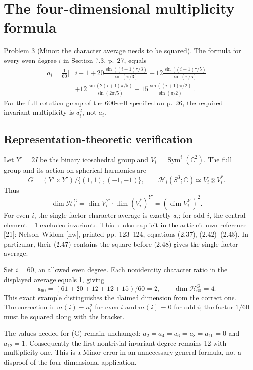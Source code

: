 \documentclass[10pt]{article}
\begin{document}
\section*{The four-dimensional multiplicity formula}
Problem 3 (Minor: the character average needs to be squared).  The formula for every even degree \(i\) in Section 7.3, p. 27, equals \[\begin{aligned}
 a_i=\frac1{60}\bigg[&
 i+1+20\frac{\sin((i+1)\pi/3)}{\sin(\pi/3)}
 +12\frac{\sin((i+1)\pi/5)}{\sin(\pi/5)}\\
 &+12\frac{\sin(2(i+1)\pi/5)}{\sin(2\pi/5)}
 +15\frac{\sin((i+1)\pi/2)}{\sin(\pi/2)}
 \bigg].
\end{aligned}\] For the full rotation group of the 600-cell specified on p. 26, the required invariant multiplicity is \(a_i^2\), not \(a_i\).\par
\subsection*{Representation-theoretic verification}
Let \(Y'=2I\) be the binary icosahedral group and \(V_i=\operatorname{Sym}^i(\mathbb C^2)\). The full group and its action on spherical harmonics are \[G=(Y'\times Y')/\{(1,1),(-1,-1)\},\qquad
 \mathcal H_i(S^3;\mathbb C)\simeq V_i\otimes V_i^*.\] Thus \[\dim\mathcal H_i^G
   =\dim V_i^{Y'}\cdot\dim(V_i^*)^{Y'}
   =(\dim V_i^{Y'})^2.\] For even \(i\), the single-factor character average is exactly \(a_i\); for odd \(i\), the central element \(-1\) excludes invariants. This is also explicit in the article’s own reference [21]: Nelson–Widom [nw], printed pp. 123–124, equations (2.37), (2.42)–(2.48). In particular, their (2.47) contains the square before (2.48) gives the single-factor average.\par
Set \(i=60\), an allowed even degree. Each nonidentity character ratio in the displayed average equals 1, giving \[a_{60}=(61+20+12+12+15)/60=2,\qquad
 \dim\mathcal H_{60}^G=4.\] This exact example distinguishes the claimed dimension from the correct one. The correction is \(m(i)=a_i^2\) for even \(i\) and \(m(i)=0\) for odd \(i\); the factor \(1/60\) must be squared along with the bracket.\par
The values needed for (G) remain unchanged: \(a_2=a_4=a_6=a_8=a_{10}=0\) and \(a_{12}=1\). Consequently the first nontrivial invariant degree remains 12 with multiplicity one. This is a Minor error in an unnecessary general formula, not a disproof of the four-dimensional application.\par
\end{document}
